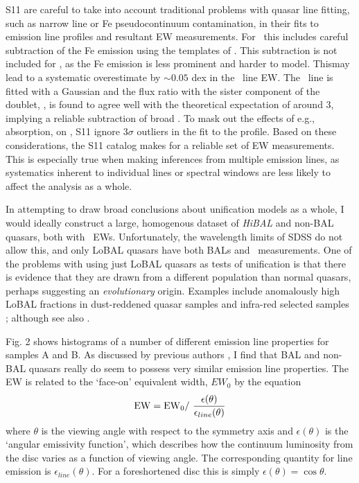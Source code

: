 S11 are careful to take into account traditional problems with quasar line fitting,
such as narrow line or Fe pseudocontinuum contamination, in their fits to 
emission line profiles and resultant EW measurements. For \mgline\
this includes careful subtraction of the Fe emission using the templates
of \citep{vestergaard2001}. This subtraction is not included for \civfull,
as the Fe emission is less prominent and harder to model. Thismay lead to
a systematic overestimate by $\sim0.05$ dex in the \civ\ line EW. 
The \oiiifull\ line is fitted
with a Gaussian and the flux ratio with the sister component 
of the doublet, \oiiidoublet, is found to agree well with the theoretical
expectation of around 3, implying a reliable subtraction of broad \hb.
To mask out the effects of e.g., absorption, on \civ, S11 ignore 
$3\sigma$ outliers in the fit to the profile. Based on these
considerations, the S11 catalog makes for a reliable set of EW 
measurements. This is especially true when making inferences from 
multiple emission lines, as systematics inherent to individual lines 
or spectral windows are less likely to affect the analysis as a whole.

In attempting to draw broad conclusions about unification models as a whole,
I would ideally construct a large, homogenous dataset of 
{\em HiBAL} and non-BAL quasars, both with \oiiifull\ EWs. Unfortunately,
the wavelength limits of SDSS do not allow this, and only LoBAL quasars have 
both BALs and \ewo\ measurements. One of the problems with
using just LoBAL quasars as tests of unification is that there is evidence 
that they are drawn from a different population than normal quasars, perhaps
suggesting an {\em evolutionary} origin. Examples include anomalously 
high LoBAL fractions in dust-reddened quasar samples \citep{urrutia2009} 
and infra-red selected samples \citep{dai2012}; 
although see also \cite{lazarova2012}.


Fig. 2 shows histograms of a number of different 
emission line properties for samples A and B. 
As discussed by previous authors \cite[e.g.][]{weymann1991}, I find that BAL
and non-BAL quasars really do seem to possess very similar emission line 
properties. The EW is related to the `face-on' equivalent width,
$EW_0$ by the equation
\begin{equation}
{\rm EW} = {\rm EW}_0 /~\frac{\epsilon(\theta)}{\epsilon_{line}(\theta)}
\end{equation}
where $\theta$ is the viewing angle with respect to the symmetry axis 
and $\epsilon(\theta)$ is the `angular emissivity function', which describes 
how the continuum luminosity from the disc varies as a function of viewing angle.
The corresponding quantity for line emission is $\epsilon_{line}(\theta)$.
For a foreshortened disc this is simply $\epsilon(\theta) = \cos \theta$.

